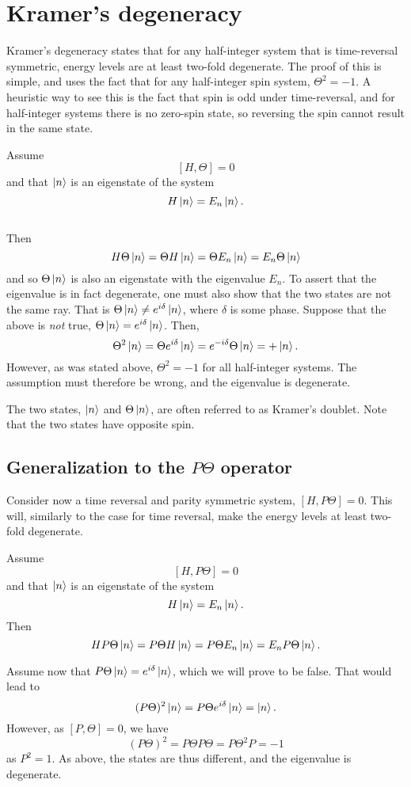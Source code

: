 \section{Kramer's degeneracy}


Kramer's degeneracy states that for any half-integer system that is time-reversal symmetric, energy levels are at least two-fold degenerate.
The proof of this is simple, and uses the fact that for any half-integer spin system, $\Theta^2 = -1$.
A heuristic way to see this is the fact that spin is odd under time-reversal, and for half-integer systems there is no zero-spin state, so reversing the spin cannot result in the same state.
\begin{Proof}
  Assume
  $$ [H, \Theta] = 0 $$
  and that $\ket{n}$ is an eigenstate of the system
  $$ H \ket{n} = E_n \ket{n}.$$\\
  Then
  $$
  H \Theta \ket{n} = \Theta H \ket{n} = \Theta E_n \ket{n} = E_n \Theta \ket{n}
  $$
  and so $\Theta \ket{n}$ is also an eigenstate with the eigenvalue $E_n$.
  To assert that the eigenvalue is in fact degenerate, one must also show that the two states are not the same ray.
  That is $\Theta \ket{n} \neq e^{i \delta} \ket{n}$, where $\delta$ is some phase.
  Suppose that the above is \emph{not} true, $\Theta \ket{n} = e^{i \delta} \ket{n}$.
  Then,
  $$
  \Theta^2 \ket{n} = \Theta e^{i\delta} \ket{n} = e^{-i\delta} \Theta \ket{n} = + \ket{n}.
  $$
  However, as was stated above, $\Theta^2 = -1$ for all half-integer systems.
  The assumption must therefore be wrong, and the eigenvalue is degenerate.
\end{Proof}
The two states, $\ket{n}$ and $\Theta \ket{n}$, are often referred to as Kramer's doublet.
Note that the two states have opposite spin.

\subsection{Generalization to the $P \Theta$ operator}
Consider now a time reversal and parity symmetric system, $[H, P \Theta] = 0$.
This will, similarly to the case for time reversal, make the energy levels at least two-fold degenerate.
\begin{Proof}
  Assume
  $$
  [H,P \Theta] = 0
  $$
  and that $\ket{n}$ is an eigenstate of the system
  $$
  H\ket{n} = E_n\ket{n}.
  $$
  Then
  $$
  H P \Theta\ket{n} =
  P\Theta H \ket{n} =
  P \Theta E_n \ket{n} =
  E_n P\Theta \ket{n}.
  $$

  Assume now that $P\Theta \ket{n} = e^{i\delta} \ket{n}$, which we will prove to be false.
  That would lead to
  $$
  (P\Theta)^2 \ket{n} = P\Theta e^{i\delta} \ket{n}
  = \ket{n}.
  $$
  However, as $[P, \Theta] = 0$, we have
  $$
  (P\Theta)^2 =
  P\Theta P \Theta=
  P\Theta^2 P=
  -1
  $$
  as $P^2 = 1$.
  As above, the states are thus different, and the eigenvalue is degenerate.
\end{Proof}
